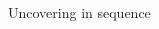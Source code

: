 \begin{frame}{Uncovering in sequence}
\begin{columns}
\begin{column}{0.50\textwidth}
\begin{center}
            \end{center}
        \end{column}
        \begin{column}{0.50\textwidth}
            \begin{center}
            \end{center}
        \end{column}
    \end{columns}
\end{frame}